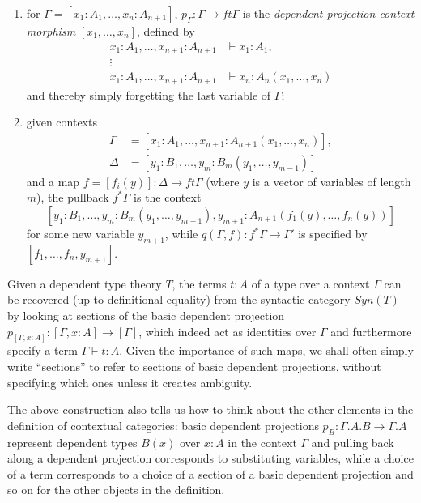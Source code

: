 \documentclass[a4paper,fontsize=12pt]{scrartcl}
\begin{document}
\begin{construction}
\begin{enumerate}
    \item for $\Gamma=[x_1:A_1,\ldots,x_n:A_{n+1}]$,
      $p_{\Gamma}\colon\Gamma\rightarrow ft\Gamma$ is the \emph{dependent
      projection context morphism} $[x_1,\ldots,x_n]$, defined by
      \begin{align*}
        x_1:A_1,\ldots,x_{n+1}:A_{n+1} &\vdash x_1:A_1, \\
        \vdots & \\
        x_1:A_1,\ldots,x_{n+1}:A_{n+1} &\vdash x_n:A_n(x_1,\ldots,x_n)
      \end{align*}
      and thereby simply forgetting the last variable of $\Gamma$;
    \item given contexts
      \begin{align*}
        \Gamma &=[x_1:A_1,\ldots,x_{n+1}:A_{n+1}(x_1,\ldots,x_n)], \\
        \Delta &=[y_1:B_1,\ldots,y_m:B_m(y_1,\ldots,y_{m-1})]
      \end{align*}
      and a map $f=[f_i(y)]\colon\Delta\rightarrow ft\Gamma$ (where $y$ is a
      vector of variables of length $m$), the pullback $f^*\Gamma$ is the
      context
      \[[y_1:B_1,\ldots,y_m:B_m(y_1,\ldots,y_{m-1}),y_{m+1}:A_{n+1}(f_1(y),\ldots,f_n(y))]\]
      for some new variable $y_{m+1}$, while $q(\Gamma,f)\colon
      f^*\Gamma\rightarrow\Gamma'$ is specified by $[f_1,\ldots,f_n,y_{m+1}]$.
  \end{enumerate}
\end{construction}

\begin{rmk}
  Given a dependent type theory $T$, the terms $t:A$ of a type over a context
  $\Gamma$ can be recovered (up to definitional equality) from the syntactic
  category $Syn(T)$ by looking at sections of the basic dependent projection
  $p_{[\Gamma,x:A]}\colon[\Gamma,x:A]\rightarrow[\Gamma]$, which indeed act as
  identities over $\Gamma$ and furthermore specify a term $\Gamma\vdash t:A$.
  Given the importance of such maps, we shall often simply write ``sections'' to
  refer to sections of basic dependent projections, without specifying which ones
  unless it creates ambiguity.

  The above construction also tells us how to think about the other elements in
  the definition of contextual categories: basic dependent
  projections $p_B\colon\Gamma.A.B\rightarrow\Gamma.A$ represent dependent
  types $B(x)$ over $x:A$ in the context $\Gamma$ and pulling back along
  a dependent projection corresponds to substituting variables, while a choice of
  a term corresponds to a choice of a section of a basic dependent projection
  and so on for the other objects in the definition.
\end{rmk}
\end{document}
